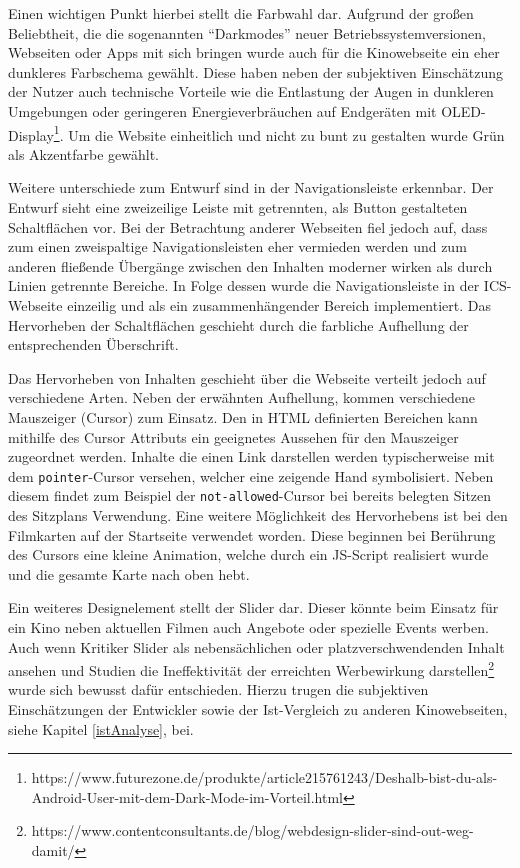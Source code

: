 	
	Einen wichtigen Punkt hierbei stellt die Farbwahl dar. Aufgrund der großen Beliebtheit, die die sogenannten \enquote{Darkmodes} neuer Betriebssystemversionen, Webseiten oder Apps mit sich bringen wurde auch für die Kinowebseite ein eher dunkleres Farbschema gewählt. Diese haben neben der subjektiven Einschätzung der Nutzer auch technische Vorteile wie die Entlastung der Augen in dunkleren Umgebungen oder geringeren Energieverbräuchen auf Endgeräten mit OLED-Display\footnote{https://www.futurezone.de/produkte/article215761243/Deshalb-bist-du-als-Android-User-mit-dem-Dark-Mode-im-Vorteil.html}. Um die Website einheitlich und nicht zu bunt zu gestalten wurde Grün als Akzentfarbe gewählt.
	
	
	Weitere unterschiede zum Entwurf sind in der Navigationsleiste erkennbar. Der Entwurf sieht eine zweizeilige Leiste mit getrennten, als Button gestalteten Schaltflächen vor. Bei der Betrachtung anderer Webseiten fiel jedoch auf, dass zum einen zweispaltige Navigationsleisten eher vermieden werden und zum anderen fließende Übergänge zwischen den Inhalten moderner wirken als durch Linien getrennte Bereiche. In Folge dessen wurde die Navigationsleiste in der \ac{ICS}-Webseite einzeilig und als ein zusammenhängender Bereich implementiert. Das Hervorheben der Schaltflächen geschieht durch die farbliche Aufhellung der entsprechenden Überschrift. 
	
	
	Das Hervorheben von Inhalten geschieht über die Webseite verteilt jedoch auf verschiedene Arten. Neben der erwähnten Aufhellung, kommen verschiedene Mauszeiger (Cursor) zum Einsatz. Den in HTML definierten Bereichen kann mithilfe des Cursor Attributs ein geeignetes Aussehen für den Mauszeiger zugeordnet werden. Inhalte die einen Link darstellen werden typischerweise mit dem \texttt{pointer}-Cursor versehen, welcher eine zeigende Hand symbolisiert. Neben diesem findet zum Beispiel der \texttt{not-allowed}-Cursor bei bereits belegten Sitzen des Sitzplans Verwendung. Eine weitere Möglichkeit des Hervorhebens ist bei den Filmkarten auf der Startseite verwendet worden. Diese beginnen bei Berührung des Cursors eine kleine Animation, welche durch ein JS-Script realisiert wurde und die gesamte Karte nach oben hebt. 
	
	Ein weiteres Designelement stellt der Slider dar. Dieser könnte beim Einsatz für ein Kino neben aktuellen Filmen auch Angebote oder spezielle Events werben. Auch wenn Kritiker Slider als nebensächlichen oder platzverschwendenden Inhalt ansehen und Studien die Ineffektivität der erreichten Werbewirkung darstellen\footnote{https://www.contentconsultants.de/blog/webdesign-slider-sind-out-weg-damit/} wurde sich bewusst dafür entschieden. Hierzu trugen die subjektiven Einschätzungen der Entwickler sowie der Ist-Vergleich zu anderen Kinowebseiten, siehe Kapitel \vref{istAnalyse}, bei.
	
